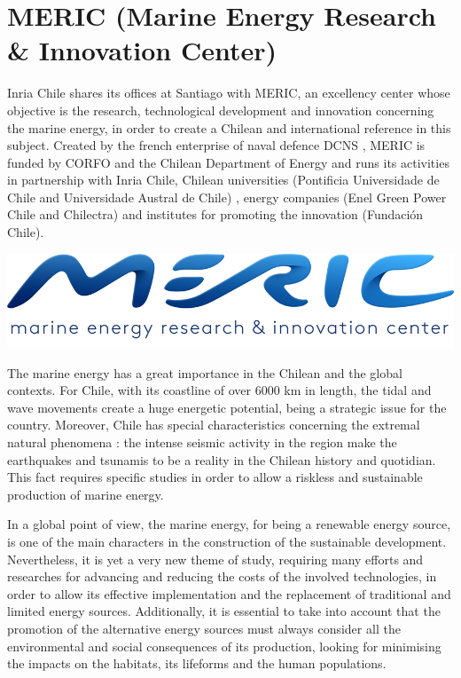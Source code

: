 \section*{MERIC (Marine Energy Research \& Innovation Center)}

\indent Inria Chile shares its offices at Santiago with MERIC, an excellency center whose objective is the research, technological development and innovation concerning the marine energy, in order to create a Chilean and international reference in this subject. Created by the french enterprise of naval defence DCNS , MERIC is funded by CORFO and the Chilean Department of Energy and runs its activities in partnership with Inria Chile, Chilean universities (Pontificia Universidade de Chile and Universidade Austral de Chile) , energy companies (Enel Green Power Chile and Chilectra) and institutes for promoting the innovation (Fundación Chile).


\indent

\indent

\begingroup
\centering
\includegraphics[scale=.3]{figures/logos/meric.png}
\endgroup


\indent The marine energy has a great importance in the Chilean and the global contexts. For Chile, with its coastline of over 6000 km in length, the tidal and wave movements create a huge energetic potential, being a strategic issue for the country. Moreover, Chile has special characteristics concerning the extremal natural phenomena : the intense seismic activity in the region make the earthquakes and tsunamis to be a reality in the Chilean history and quotidian. This fact requires specific studies in order to allow a riskless and sustainable production of marine energy.

\indent In a global point of view, the marine energy, for being a renewable energy source, is one of the main characters in the construction of the sustainable development. Nevertheless, it is yet a very new theme of study, requiring many efforts and researches for advancing and reducing the costs of the involved technologies, in order to allow its effective implementation and the replacement of traditional and limited energy sources. Additionally, it is essential to take into account that the promotion of the alternative energy sources must always consider all the environmental and social consequences of its production, looking for minimising the impacts on the habitats, its lifeforms and the human populations.

